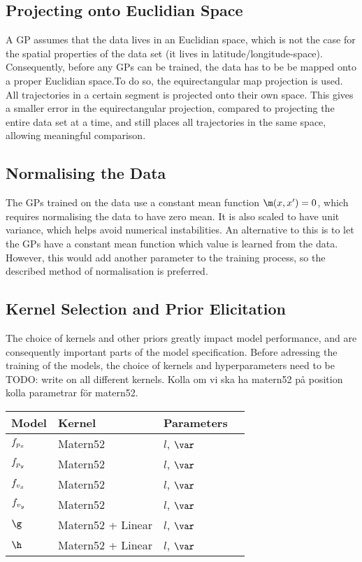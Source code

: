 \subsection{Projecting onto Euclidian Space}\label{projecting-onto-euclidian-space}
A GP assumes that the data lives in an Euclidian
space, which is not the case for the spatial properties of the data set 
(it lives in latitude/longitude-space). Consequently, before any GPs can be trained,
the data has to be be mapped onto a proper Euclidian space.To do so, 
the equirectangular map projection is used. 
All trajectories in a certain segment is projected onto their own
space. This gives a smaller error in the equirectangular projection,
compared to projecting the entire data set at a time, and still
places all trajectories in the same space, allowing 
meaningful comparison.

\subsection{Normalising the Data}\label{sec:normalising-the-data}
The GPs trained on the data use a constant mean function $\m(x, x') =
0$, which requires normalising the data to have zero mean. It is also scaled to
have unit variance, which helps avoid numerical instabilities.
An alternative to this is to let the GPs have a constant mean function
which value is learned from the data. However, this would add another
parameter to the training process, so the described method of normalisation
is preferred.

\subsection{Kernel Selection and Prior Elicitation}
The choice of kernels and other priors greatly impact model
performance, and are consequently important parts of the model specification.
Before adressing the training of the models, the choice of kernels and
hyperparameters need to be 
TODO: write on all different kernels. Kolla om vi ska ha matern52 på position
kolla parametrar för matern52. 
\begin{center}
    \begin{tabular}{| l | l | l | l |}
    \hline
    Model & Kernel & Parameters \\ \hline
    $f_{p_x}$ & Matern52 &  $l$, $\var$ \\ \hline
    $f_{p_y}$ & Matern52 &  $l$, $\var$ \\ \hline
    $f_{v_x}$ & Matern52 &  $l$, $\var$ \\ \hline
    $f_{v_y}$ & Matern52 &  $l$, $\var$ \\ \hline
    $\g$           & Matern52 + Linear & $l$, $\var$ \\ \hline
    $\h$           & Matern52 + Linear & $l$, $\var$
    \hline
    \end{tabular}
\end{center}

